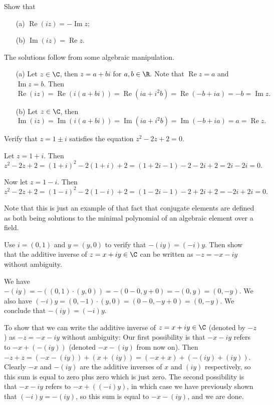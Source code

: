 \begin{problem}
    Show that 
    \begin{enumerate}
        \item[(a)] $\operatorname{Re}(iz)= - \operatorname{Im}z;$
        \item[(b)] $\operatorname{Im}(iz) = \operatorname{Re}z.$
    \end{enumerate}
\end{problem}
\begin{solution}
    The solutions follow from some algebraic manipulation. 
    \begin{enumerate}
        \item[(a)] Let $z \in \C$, then $z = a+bi$ for $a,b \in \R.$ Note that $\operatorname{Re}z=a$ and $\operatorname{Im}z = b.$ Then $\operatorname{Re}(iz) = \operatorname{Re}(i(a+bi))=\operatorname{Re}(ia+i^2b)=\operatorname{Re}(-b+ia)=-b=\operatorname{Im}z.$ 
        \item[(b)] Let $z \in \C$, then $\operatorname{Im}(iz)=\operatorname{Im}(i(a+bi))=\operatorname{Im}(ia+i^2b)=\operatorname{Im}(-b+ia)=a=\operatorname{Re}z.$
    \end{enumerate}
\end{solution}

\begin{problem}[Question 4]
    Verify that $z=1 \pm i$ satisfies the equation $z^2-2z+2=0.$
\end{problem}
\begin{solution}
    Let $z = 1+i.$ Then $z^2-2z+2=(1+i)^2-2(1+i)+2=(1+2i-1)-2-2i+2=2i-2i=0.$ 
    
    Now let $z=1-i.$ Then $z^2-2z+2=(1-i)^2-2(1-i)+2=(1-2i-1)-2+2i+2=-2i+2i=0.$

    Note that this is just an example of that fact that conjugate elements are defined as both being solutions to the minimal polynomial of an algebraic element over a field.
\end{solution}

\begin{problem}[Question 10]
    Use $i=(0,1)$ and $y=(y,0)$ to verify that $-(iy)=(-i)y.$ Then show that the additive inverse of $z=x+iy \in \C$ can be written as $-z=-x-iy$ without ambiguity.
\end{problem}
\begin{solution}
    We have $-(iy)=-\left( (0,1)\cdot(y,0) \right) = -\left( 0-0, y+0 \right) = -(0,y)=(0,-y)$. We also have $(-i)y=(0,-1)\cdot(y,0)=(0-0, -y+0)=(0,-y).$ We conclude that $-(iy)=(-i)y.$ 

    To show that we can write the additive inverse of $z = x+iy \in \C$ (denoted by $-z$ ) as $-z=-x-iy$ without ambiguity: Our first possibility is that $-x-iy$ refers to $-x+\left( -(iy) \right) $ (denoted $-x-(iy)$ from now on). Then $-z+z=(-x-(iy))+(x+(iy))=(-x+x)+(-(iy)+(iy))$. Clearly $-x$ and $-(iy)$ are the additive inverses of $x$ and $(iy)$ respectively, so this sum is equal to zero plus zero which is just zero. The second possibility is that $-x-iy$ refers to $-x+((-i)y)$, in which case we have previously shown that $(-i)y=-(iy)$, so this sum is equal to $-x-(iy)$, and we are done.
\end{solution}
